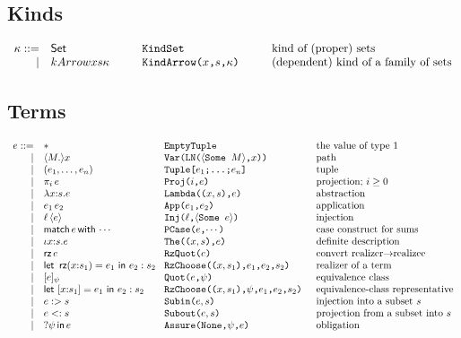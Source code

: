 \documentclass[12pt]{article}
\newcommand{\M}{M}
\newcommand{\e}{e}
\newcommand{\s}{s}
\newcommand{\n}{x} %
\newcommand{\p}{\psi} %
\newcommand{\x}{\n} %
\renewcommand{\k}{\kappa} %
\renewcommand{\l}{{\ell}}
\newcommand{\kSet}{\mathsf{Set}}
\begin{document}
\subsection{Kinds}
\[
\begin{array}{rl@{\hspace{1cm}}l@{\hspace{1cm}}l}
\k ::= & \kSet & \texttt{KindSet} & \mbox{kind of (proper) sets}\\
 |& kArrow{\x}{\s}{\k} & \texttt{KindArrow($\x$,$\s$,$\k$)} & \mbox{(dependent) kind of a family of sets}
\end{array}
\]

\subsection{Terms}

\[
\begin{array}{rl@{\hspace{0.3cm}}l@{\hspace{0.5cm}}l}
\e ::= & \mathsf{*} & \texttt{EmptyTuple} & \mbox{the value of type $1$}\\
|&\langle\M.\rangle\x & \texttt{Var(LN($\langle$Some $\M\rangle$,$\x$))} & \mbox{path}\\
|&(\e_1,\ldots,\e_n)&\texttt{Tuple[$\e_1$;\ldots;$\e_n$]}&\mbox{tuple}\\
|&\pi_i\,\e&\texttt{Proj($i$,$\e$)}&\mbox{projection; $i\geq 0$}\\
|&\lambda\x{:}\s.\e&\texttt{Lambda(($\x,\s$),$\e$)}&\mbox{abstraction}\\
|&\e_1\,\e_2&\texttt{App($\e_1$,$\e_2$)}&\mbox{application}\\
|&\l\,\langle\e\rangle&\texttt{Inj($\l$,$\langle$Some $\e$$\rangle$)}&\mbox{injection}\\
 |&\mathsf{match}\,\e\,\mathsf{with}\,\cdots
     & \texttt{PCase($\e$,$\cdots$)} & \mbox{case construct for sums}\\
|&\iota\x{:}\s.\e&\texttt{The(($\x,\s$),$\e$)}&\mbox{definite description}\\
|&\mathop{\mathsf{rz}}\e&\texttt{RzQuot($\e$)}&\mbox{convert realizer$\to$realizee }\\
|&\mathsf{let}\ \mathop{\mathsf{rz}}(\x{:}\s_1) = \e_1\ \mathsf{in}\ \e_2 : \s_2
     &\texttt{RzChoose(($\x,\s_1$),$\e_1$,$\e_2$,$\s_2$)} &
     \mbox{realizer of a term}\\
|&[\e]_\p & \texttt{Quot($\e$,$\p$)} & \mbox{equivalence class}\\
|&\mathsf{let}\ [\x{:}\s_1] = \e_1\ \mathsf{in}\ \e_2 : \s_2
     &\texttt{RzChoose(($\x,\s_1$),$\p$,$\e_1$,$\e_2$,$\s_2$)} &
     \mbox{equivalence-class representative}\\
|&\e :> \s& \texttt{Subin($\e,\s$)} & \mbox{injection into a subset $\s$}\\
|&\e <: \s& \texttt{Subout($\e,\s$)} & \mbox{projection from a subset into $\s$}\\
 |&?\p\,\mathsf{in}\,\e&\texttt{Assure(None,$\p$,$\e$)} & \mbox{obligation}\\
\end{array}
\]
\end{document}
